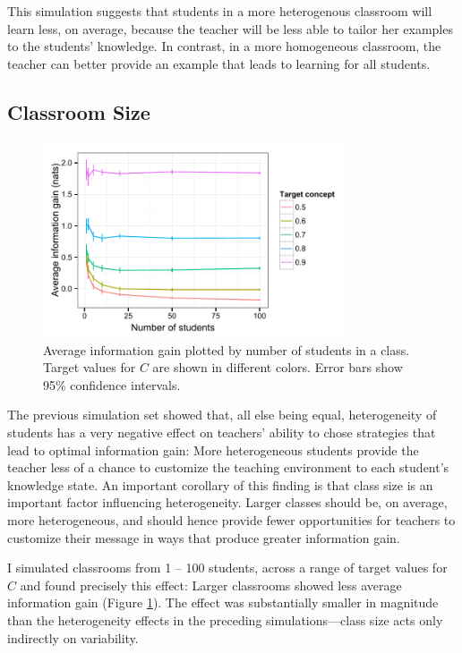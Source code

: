 \documentclass[10pt,letterpaper]{article}
\begin{document}
This simulation suggests that students in a more heterogenous classroom will learn less, on average, because the teacher will be less able to tailor her examples to the students' knowledge. In contrast, in a more homogeneous classroom, the teacher can better provide an example that leads to learning for all students. 

\subsection{Classroom Size}

\begin{figure}[t]
\begin{center}
\includegraphics[width=3.5in]{figures/class_size.pdf}
\end{center}
\caption{\label{fig:class} Average information gain plotted by number of students in a class. Target values for $C$ are shown in different colors. Error bars show 95\% confidence intervals.}
\end{figure}

The previous simulation set showed that, all else being equal, heterogeneity of students has a very negative effect on teachers' ability to chose strategies that lead to optimal information gain: More heterogeneous students provide the teacher less of a chance to customize the teaching environment to each student's knowledge state. An important corollary of this finding is that class size is an important factor influencing heterogeneity. Larger classes should be, on average, more heterogeneous, and should hence provide fewer opportunities for teachers to customize their message in ways that produce greater information gain.

I simulated classrooms from 1 -- 100 students, across a range of target values for $C$ and found precisely this effect: Larger classrooms showed less average information gain (Figure \ref{fig:class}). The  effect was substantially smaller in magnitude than the heterogeneity effects in the preceding simulations---class size acts only indirectly on variability. 
\end{document}
